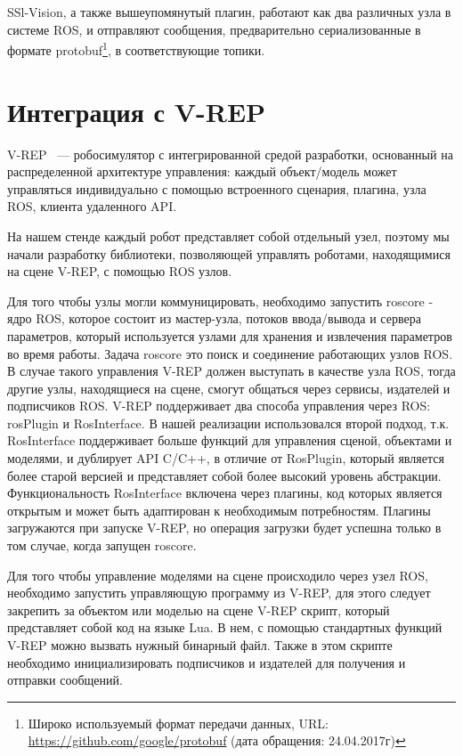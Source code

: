 \documentclass{spisok-article}
\begin{document}
SSl-Vision, а также вышеупомянутый плагин, работают как два различных узла в системе ROS, и отправляют сообщения, предварительно сериализованные в формате protobuf\footnote{Широко используемый формат передачи данных, URL: \url{https://github.com/google/protobuf} (дата обращения: 24.04.2017г)}, в соответствующие топики.

\section{Интеграция с V-REP}

V-REP~\cite{rohmer2013vrep} --- робосимулятор с интегрированной средой разработки, основанный на распределенной архитектуре управления: каждый объект/модель может управляться индивидуально с помощью встроенного сценария, плагина, узла ROS, клиента удаленного API.

На нашем стенде каждый робот представляет собой отдельный узел, поэтому мы начали разработку библиотеки, позволяющей управлять роботами, находящимися на сцене V-REP, с помощью ROS узлов.

Для того чтобы узлы могли коммуницировать, необходимо запустить roscore - ядро ROS, которое состоит из мастер-узла, потоков ввода/вывода и сервера параметров, который используется узлами для хранения и извлечения параметров во время работы. Задача roscore это поиск и соединение работающих узлов ROS. В случае такого управления V-REP должен выступать в качестве узла ROS, тогда  другие узлы, находящиеся на сцене, смогут общаться через сервисы, издателей и подписчиков ROS. V-REP поддерживает два способа управления через ROS:  rosPlugin и RosInterface. В нашей реализации использовался второй подход, т.к. RosInterface поддерживает больше функций для управления сценой, объектами и моделями, и дублирует API C/C++, в отличие от RosPlugin, который является более старой версией и представляет собой более высокий уровень абстракции. Функциональность RosInterface включена через плагины, код которых является открытым и может быть адаптирован к необходимым потребностям. Плагины загружаются при запуске V-REP, но операция загрузки будет успешна  только в том случае, когда запущен roscore.

Для того чтобы управление моделями на сцене происходило через узел ROS, необходимо запустить управляющую программу из V-REP, для этого следует закрепить за объектом или моделью на сцене V-REP скрипт, который представляет собой код на языке Lua. В нем, с помощью стандартных функций V-REP можно вызвать нужный бинарный файл.  Также в этом скрипте необходимо инициализировать подписчиков и издателей для получения и отправки сообщений.
\end{document}

